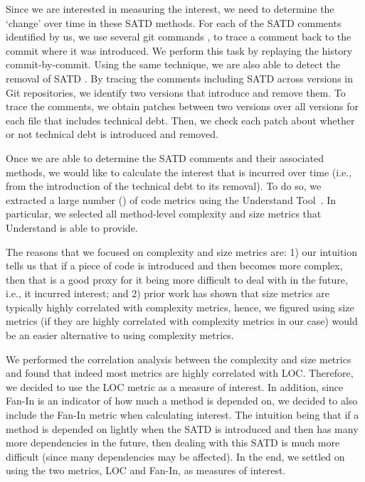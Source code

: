 Since we are interested in measuring the interest, we need to determine the `change' over time in these SATD methods. For each of the SATD comments identified by us, we use several git commands , to trace a comment back to the commit where it was introduced. We perform this task by replaying the history commit-by-commit. Using the same technique, we are also able to detect the removal of SATD . By tracing the comments including SATD across versions in Git repositories, we identify two versions that introduce and remove them. To trace the comments, we obtain patches between two versions over all versions for each file that includes technical debt. Then, we check each patch about whether or not technical debt is introduced and removed. 

Once we are able to determine the SATD comments and their associated methods, we would like to calculate the interest that is incurred over time (i.e., from the introduction of the technical debt to its removal). To do so, we extracted a large number () of code metrics using the  {\sc Understand Tool}~\cite{Understand}. In particular, we selected all method-level complexity and size metrics that Understand is able to provide.

The reasons that we focused on complexity and size metrics are: 1) our intuition tells us that if a piece of code is introduced and then becomes more complex, then that is a good proxy for it being more difficult to deal with in the future, i.e., it incurred interest; and 2) prior work has shown that size metrics are typically highly correlated with complexity metrics, hence, we figured using size metrics (if they are highly correlated with complexity metrics in our case) would be an easier alternative to using complexity metrics.

We performed the correlation analysis between the complexity and size metrics and found that indeed most metrics are highly correlated with LOC. Therefore, we decided to use the LOC metric as a measure of interest. In addition, since Fan-In is an indicator of how much a method is depended on, we decided to also include the Fan-In metric when calculating interest. The intuition being that if a method is depended on lightly when the SATD is introduced and then has many more dependencies in the future, then dealing with this SATD is much more difficult (since many dependencies may be affected). In the end, we settled on using the two metrics, LOC and Fan-In, as measures of interest.

